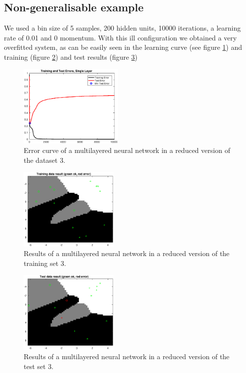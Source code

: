 \documentclass{article}
\begin{document}
\subsection{Non-generalisable example}

We used a bin size of 5 samples, 200 hidden units, 10000 iterations, a learning rate of 0.01 and 0 momentum. With this ill configuration we obtained a very overfitted system, as can be easily seen in the learning curve (see figure \ref{fig:overfit_error}) and training (figure \ref{fig:overfit_result_train}) and test results (figure \ref{fig:overfit_result_test})

\begin{figure}[!htb]
\centering
\includegraphics[height=4cm]{images/overfit_error}
\caption{Error curve of a multilayered neural network in a reduced version of the dataset 3.}
\label{fig:overfit_error}
\end{figure}

\begin{figure}[!htb]
\centering
\includegraphics[height=4cm]{images/overfit_result_train}
\caption{Results of a multilayered neural network in a reduced version of the training set 3.}
\label{fig:overfit_result_train}
\end{figure}

\begin{figure}[!htb]
\centering
\includegraphics[height=4cm]{images/overfit_result_test}
\caption{Results of a multilayered neural network in a reduced version of the test set 3.}
\label{fig:overfit_result_test}
\end{figure}
\end{document}
